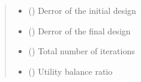 \documentclass[a4paper,10pt,english]{sphinxhowto}
\begin{document}
\begin{fulllineitems}
\begin{fulllineitems}
\begin{quote}
\begin{description}
\begin{itemize}
\item {} 
\sphinxAtStartPar
{} () \textendash{} D\sphinxhyphen{}error of the initial design

\item {} 
\sphinxAtStartPar
{} () \textendash{} D\sphinxhyphen{}error of the final design

\item {} 
\sphinxAtStartPar
{} () \textendash{} Total number of iterations

\item {} 
\sphinxAtStartPar
{} () \textendash{} Utility balance ratio

\end{itemize}


\end{description}\end{quote}

\end{fulllineitems}


\end{fulllineitems}




\renewcommand{\indexname}{Index}
\printindex
\end{document}
